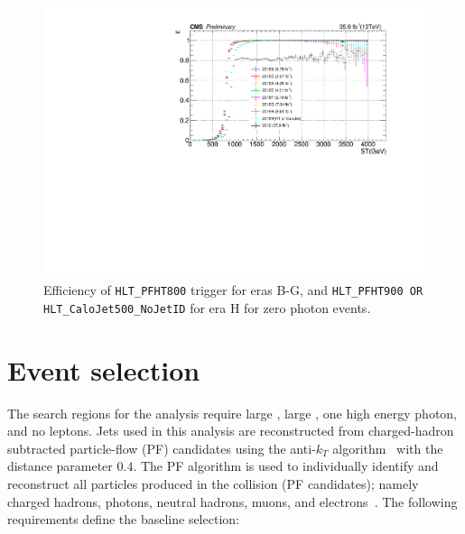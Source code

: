 \begin{figure}[htbp!]
  \centering
  \includegraphics[width=0.48\linewidth]{../Figures/Chap3/triggers/Run2016_MET_HT800or900_2016H_HT800or900orCaloJet500.pdf}
  \captionsetup{width=.9\linewidth}
  \caption{Efficiency of \texttt{HLT\_PFHT800} trigger for eras B-G, and \texttt{HLT\_PFHT900 OR HLT\_CaloJet500\_NoJetID} for era H for zero photon events.}
  \label{fig:zeroPhotonTrigger_eff}
\end{figure}

\section{Event selection}
\label{sec:event-selection}
The search regions for the analysis require large \ptmiss,
large \ST, one high energy photon, and no leptons. 
Jets used in this analysis are reconstructed from charged-hadron 
subtracted  particle-flow (PF) candidates using the anti-$k_T$ 
algorithm~\cite{Cacciari:2008gp} with the distance parameter $0.4$. 
The PF algorithm is used to individually identify and reconstruct all particles
produced in the collision (PF candidates); namely charged hadrons, photons,
neutral hadrons, muons, and electrons~\cite{CMS-PRF-14-001}. 
The following requirements define the baseline selection:

